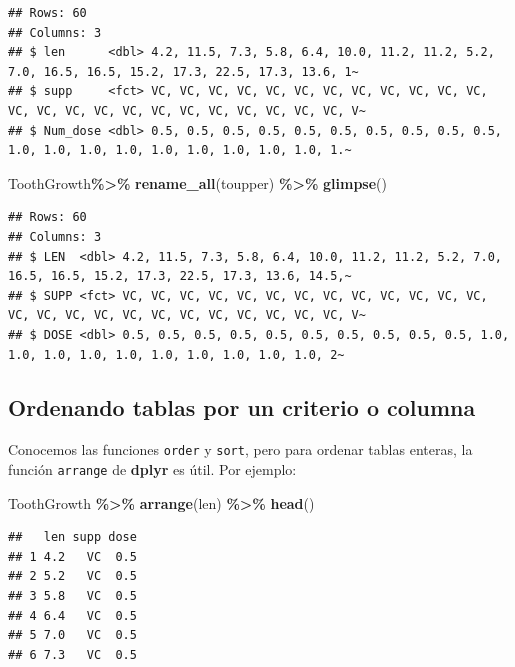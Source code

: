 \documentclass[
]{book}
\newenvironment{Shaded}{\begin{snugshade}}{\end{snugshade}}
\newcommand{\FunctionTok}[1]{\textcolor[rgb]{0.13,0.29,0.53}{\textbf{#1}}}
\newcommand{\NormalTok}[1]{#1}
\newcommand{\SpecialCharTok}[1]{\textcolor[rgb]{0.81,0.36,0.00}{\textbf{#1}}}
\begin{document}
\begin{verbatim}
## Rows: 60
## Columns: 3
## $ len      <dbl> 4.2, 11.5, 7.3, 5.8, 6.4, 10.0, 11.2, 11.2, 5.2, 7.0, 16.5, 16.5, 15.2, 17.3, 22.5, 17.3, 13.6, 1~
## $ supp     <fct> VC, VC, VC, VC, VC, VC, VC, VC, VC, VC, VC, VC, VC, VC, VC, VC, VC, VC, VC, VC, VC, VC, VC, VC, V~
## $ Num_dose <dbl> 0.5, 0.5, 0.5, 0.5, 0.5, 0.5, 0.5, 0.5, 0.5, 0.5, 1.0, 1.0, 1.0, 1.0, 1.0, 1.0, 1.0, 1.0, 1.0, 1.~
\end{verbatim}

\begin{Shaded}
\begin{Highlighting}[]
\NormalTok{ToothGrowth}\SpecialCharTok{\%\textgreater{}\%} \FunctionTok{rename\_all}\NormalTok{(toupper) }\SpecialCharTok{\%\textgreater{}\%} \FunctionTok{glimpse}\NormalTok{()}
\end{Highlighting}
\end{Shaded}

\begin{verbatim}
## Rows: 60
## Columns: 3
## $ LEN  <dbl> 4.2, 11.5, 7.3, 5.8, 6.4, 10.0, 11.2, 11.2, 5.2, 7.0, 16.5, 16.5, 15.2, 17.3, 22.5, 17.3, 13.6, 14.5,~
## $ SUPP <fct> VC, VC, VC, VC, VC, VC, VC, VC, VC, VC, VC, VC, VC, VC, VC, VC, VC, VC, VC, VC, VC, VC, VC, VC, VC, V~
## $ DOSE <dbl> 0.5, 0.5, 0.5, 0.5, 0.5, 0.5, 0.5, 0.5, 0.5, 0.5, 1.0, 1.0, 1.0, 1.0, 1.0, 1.0, 1.0, 1.0, 1.0, 1.0, 2~
\end{verbatim}

\hfill\break

\subsection{Ordenando tablas por un criterio o columna}\label{ordenando-tablas-por-un-criterio-o-columna-1}

\hfill\break
Conocemos las funciones \texttt{order} y \texttt{sort}, pero para ordenar tablas enteras, la función \texttt{arrange} de \textbf{dplyr} es útil.
Por ejemplo:

\begin{Shaded}
\begin{Highlighting}[]
\NormalTok{ToothGrowth }\SpecialCharTok{\%\textgreater{}\%} \FunctionTok{arrange}\NormalTok{(len) }\SpecialCharTok{\%\textgreater{}\%} \FunctionTok{head}\NormalTok{()}
\end{Highlighting}
\end{Shaded}

\begin{verbatim}
##   len supp dose
## 1 4.2   VC  0.5
## 2 5.2   VC  0.5
## 3 5.8   VC  0.5
## 4 6.4   VC  0.5
## 5 7.0   VC  0.5
## 6 7.3   VC  0.5
\end{verbatim}
\end{document}
